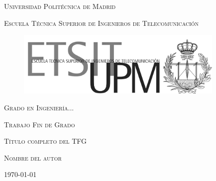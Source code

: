 \begin{titlepage}
\pagecolor{nar}
\afterpage{\nopagecolor}
    \begin{center}
        \vspace{1cm}
        \LARGE{\textsc{Universidad Politécnica de Madrid}}\par
        \vspace{0.3cm}
        \large{\textsc{Escuela Técnica Superior de Ingenieros de Telecomunicación}} \par
    \end{center}
    
    \begin{figure}[H]
        \vspace{1cm}
        \centering
        \includegraphics[width=10cm]{portada/logosportada/byn.png}
    \end{figure}

    \begin{center}
        \vspace{1.5cm}
        \Large{\textsc{Grado en Ingeniería...}}\par
        \vspace{0.2cm}
        \LARGE{\textsc{Trabajo Fin de Grado}}\par
        \vspace{2.5cm}

        \Huge{\textsc{Título completo del TFG}}

        \vspace*{2.5cm}
                  \large{\textsc{ Nombre del autor }}
        \par\vspace{2cm}
               \small{\today}
    \end{center}
\end{titlepage}